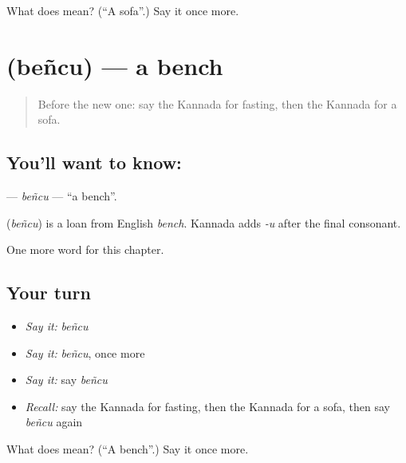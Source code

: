 \begin{tcolorbox}[breakable,colback=teal!4,colframe=teal!35!black,title={Before you move on}]
What does  mean? (\textquotedblleft{}A sofa\textquotedblright{}.) Say it once more.
\end{tcolorbox}
\section[\texorpdfstring{\kn{ಬೆಂಚು} (beñcu)}{ಬೆಂಚು (beñcu)}]{ (beñcu) — a bench}

\label{lesson:KA-C190-bencu}



\begin{quote}
Before the new one: say the Kannada for fasting, then the Kannada for a sofa.
\end{quote}

\subsection*{You'll want to know: }
\textbf{} — \emph{beñcu} — \textquotedblleft{}a bench\textquotedblright{}.

\begin{cousinweb}
\textbf{} (\emph{beñcu}) is a loan from English \emph{bench}. Kannada adds \emph{-u} after the final consonant.
\end{cousinweb}

\begin{grammarlens}[title={What you've built}]
One more word for this chapter.
\end{grammarlens}

\subsection*{Your turn}
\begin{itemize}
\raggedright
  \item \emph{Say it:} \emph{beñcu}
  \item \emph{Say it:} \emph{beñcu}, once more
  \item \emph{Say it:} say \emph{beñcu}
  \item \emph{Recall:} say the Kannada for fasting, then the Kannada for a sofa, then say \emph{beñcu} again
\end{itemize}

\begin{tcolorbox}[breakable,colback=teal!4,colframe=teal!35!black,title={Before you move on}]
What does  mean? (\textquotedblleft{}A bench\textquotedblright{}.) Say it once more.
\end{tcolorbox}
